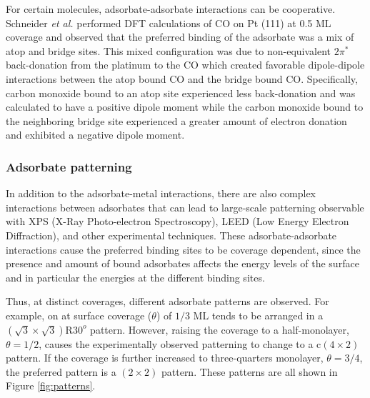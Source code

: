 For certain molecules, adsorbate-adsorbate interactions can be cooperative.
Schneider {\em et al.} performed DFT calculations of CO on Pt (111) at 0.5 ML
coverage and observed that the preferred binding of the adsorbate was a mix of
atop and bridge sites.\citep{Deshlahra:2012aa} This mixed configuration was due
to non-equivalent $2\pi^*$ back-donation from the platinum to the CO which
created favorable dipole-dipole interactions between the atop bound CO and the
bridge bound CO.  Specifically, carbon monoxide bound to an atop site
experienced less back-donation and was calculated to have a positive dipole
moment while the carbon monoxide bound to the neighboring bridge site
experienced a greater amount of electron donation and exhibited a negative
dipole moment.


\subsubsection{Adsorbate patterning}
In addition to the adsorbate-metal interactions, there are also complex
interactions between adsorbates that can lead to large-scale patterning observable
with XPS (X-Ray Photo-electron Spectroscopy), LEED (Low Energy
Electron Diffraction), and other experimental techniques. These
adsorbate-adsorbate interactions cause the preferred binding sites to be
coverage dependent, since the presence and amount of bound adsorbates
affects the energy levels of the surface and in particular the energies at the
different binding sites.

Thus, at distinct coverages, different adsorbate patterns are observed. For example,
 on  at surface coverage ($\theta$) of $1/3$ ML tends to be arranged in a
$(\sqrt{3}\times\sqrt{3})\textrm{R}30^o$ pattern. However, raising the coverage
to a half-monolayer, $\theta = 1/2$, causes the experimentally observed
patterning to change to a c$(4\times2)$ pattern. If the coverage is further
increased to three-quarters monolayer, $\theta = 3/4$, the preferred pattern is
a $(2\times2)$ pattern.\citep{Guo:1989aa} These patterns are all shown in
Figure \ref{fig:patterns}.

